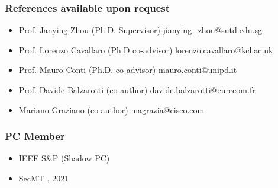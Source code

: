 \documentclass[a4paper, 10pt]{article}
\begin{document}

\subsubsection*{References available upon request}
\vspace{-0.3em}
\begin{itemize}
	\setlength{\itemsep}{1pt}
	\setlength{\parskip}{0pt}
	\setlength{\parsep}{0pt}
	
	\TabPositions{6.5cm}
	\item Prof. Janying Zhou (Ph.D. Supervisor) \tab jianying\_zhou@sutd.edu.sg
	\item Prof. Lorenzo Cavallaro (Ph.D co-advisor) \tab 
	lorenzo.cavallaro@kcl.ac.uk
	\item Prof. Mauro Conti (Ph.D. co-advisor) \tab mauro.conti@unipd.it
	\item Prof. Davide Balzarotti (co-author) \tab davide.balzarotti@eurecom.fr
	\item Mariano Graziano (co-author) \tab magrazia@cisco.com
\end{itemize}




%
\subsubsection*{PC Member}
\vspace{-0.3em}
\begin{itemize}
	\setlength{\itemsep}{1pt}
	\setlength{\parskip}{0pt}
	\setlength{\parsep}{0pt}
  
	\TabPositions{5cm}
	\item IEEE S\&P (Shadow PC) 
	\item SecMT , 2021
\end{itemize}
\end{document}
